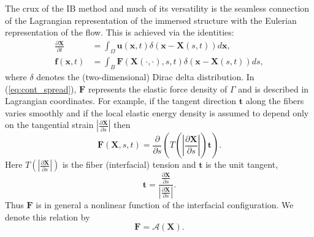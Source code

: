 \documentclass[preprint,12pt]{elsarticle}
\begin{document}
The crux of the IB method and much of its versatility is the seamless connection of the Lagrangian representation of the immersed structure with the Eulerian representation of the flow. This is achieved via the identities:
\begin{align}
\frac{\partial \mathbf{X}}{\partial t}  &= \int_{\Omega} \mathbf{u}(\mathbf{x},t)\delta(\mathbf{x}-\mathbf{X}(s,t)) d \mathbf{x}, \label{eq:cont_interp} \\
\mathbf{f}(\mathbf{x},t) &= \int_{B} \mathbf{F}(\mathbf{X}(\cdot,\cdot),s,t)\delta(\mathbf{x}-\mathbf{X}(s,t)) ds
\label{eq:cont_spread},
\end{align}
where $\delta$ denotes the (two-dimensional) Dirac delta distribution. In (\ref{eq:cont_spread}), $\mathbf{F}$
represents the elastic force density of $\Gamma$ and is described in Lagrangian coordinates.  For example, 
if the tangent direction $\mathbf{t}$ along the fibers varies smoothly and if the local elastic energy density is assumed to depend only on the tangential strain $|\frac{\partial\mathbf{X}}{\partial s}|$ then
\begin{equation}
\mathbf{F}(\mathbf{X},s,t) = \frac{ \partial }{\partial s} \left(T\left(\left|\frac{\partial\mathbf{X}}{\partial s}\right|\right) \mathbf{t}\right).
\end{equation}
Here $T(|\frac{\partial\mathbf{X}}{\partial s}|)$ is the fiber (interfacial) tension and $\mathbf{t}$ is the unit tangent,
\begin{equation}
\mathbf{t} =\frac{\frac{\partial\mathbf{X}}{\partial s}}{\left|\frac{\partial\mathbf{X}}{\partial s}\right|}.
\end{equation}
Thus $\mathbf{F}$ is in general a nonlinear function of the interfacial configuration. We denote this relation by
\begin{equation}
\mathbf{F} = \mathcal{A}(\mathbf{X}).
\end{equation}
\end{document}
